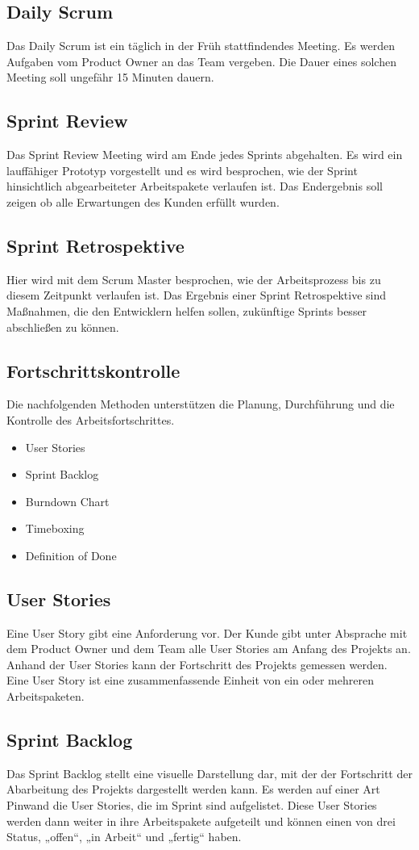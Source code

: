 \subsection{Daily Scrum}
Das Daily Scrum ist ein täglich in der Früh stattfindendes Meeting. Es werden Aufgaben vom Product Owner an das Team vergeben. Die Dauer eines solchen Meeting soll ungefähr 15 Minuten dauern.
\subsection{Sprint Review}
Das Sprint Review Meeting wird am Ende jedes Sprints abgehalten. Es wird ein lauffähiger Prototyp vorgestellt und es wird besprochen, wie der Sprint hinsichtlich abgearbeiteter Arbeitspakete verlaufen ist. Das Endergebnis soll zeigen ob alle Erwartungen des Kunden erfüllt wurden.
\subsection{Sprint Retrospektive}
Hier wird mit dem Scrum Master besprochen, wie der Arbeitsprozess bis zu diesem Zeitpunkt verlaufen ist. Das Ergebnis einer Sprint Retrospektive sind Maßnahmen, die den Entwicklern helfen sollen, zukünftige Sprints besser abschließen zu können.
\subsection{Fortschrittskontrolle}
Die nachfolgenden Methoden unterstützen die Planung, Durchführung und die Kontrolle des Arbeitsfortschrittes. 
\begin{itemize}
	\item	User Stories
	\item	Sprint Backlog
	\item	Burndown Chart
	\item	Timeboxing
	\item	Definition of Done
\end{itemize}
\subsection{User Stories}
Eine User Story gibt eine Anforderung vor. Der Kunde gibt unter Absprache mit dem Product Owner und dem Team alle User Stories am Anfang des Projekts an.
Anhand der User Stories kann der Fortschritt des Projekts gemessen werden.
Eine User Story ist eine zusammenfassende Einheit von ein oder mehreren Arbeitspaketen.
\subsection{Sprint Backlog}
Das Sprint Backlog stellt eine visuelle Darstellung dar, mit der der Fortschritt der Abarbeitung des Projekts dargestellt werden kann. Es werden auf einer Art Pinwand die User Stories, die im Sprint sind aufgelistet. Diese User Stories werden dann weiter in ihre Arbeitspakete aufgeteilt und können einen von drei Status, „offen“, „in Arbeit“ und „fertig“ haben.
